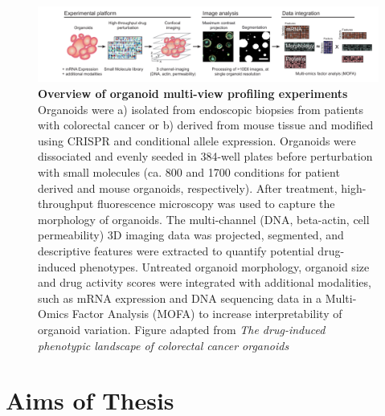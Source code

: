 \begin{flushleft}
\begin{figure}[h]
\centering
\includegraphics[width=\textwidth,
                height=\textheight,
                keepaspectratio]{figures/promise/pdf/fig_1_1_1.pdf}
\caption[Overview of organoid multi-view profiling experiments]{\textbf{Overview of organoid multi-view profiling experiments} Organoids were a) isolated from endoscopic biopsies from patients with colorectal cancer or b) derived from mouse tissue and modified using CRISPR and conditional allele expression. Organoids were dissociated and evenly seeded in 384-well plates before perturbation with small molecules (ca. 800 and 1700 conditions for patient derived and mouse organoids, respectively). After treatment, high-throughput fluorescence microscopy was used to capture the morphology of organoids.  The multi-channel (DNA, beta-actin, cell permeability) 3D imaging data was projected, segmented, and descriptive features were extracted to quantify potential drug-induced phenotypes. Untreated organoid morphology, organoid size and drug activity scores were integrated with additional modalities, such as mRNA expression and DNA sequencing data in a Multi-Omics Factor Analysis (MOFA) to increase interpretability of organoid variation. Figure adapted from \textit{The drug-induced phenotypic landscape of colorectal cancer organoids} \parencite{betgeDruginducedPhenotypicLandscape2022}}
\label{fig_130}
\end{figure}

\newpage
\section{Aims of Thesis}


\end{flushleft}
